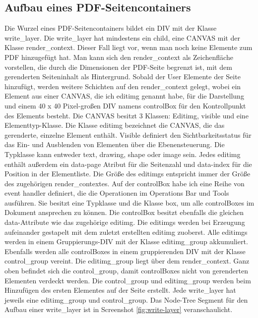 \subsection{Aufbau eines PDF-Seitencontainers}
Die Wurzel eines PDF-Seitencontainers bildet ein DIV mit der Klasse write\_layer. Die write\_layer hat mindestens ein child, eine CANVAS mit der Klasse render\_context. Dieser Fall liegt vor, wenn man noch keine Elemente zum PDF hinzugefügt hat. Man kann sich den render\_context als Zeichenfläche vorstellen, die durch die Dimensionen der PDF-Seite begrenzt ist, mit dem gerenderten Seiteninhalt als Hintergrund. Sobald der User Elemente der Seite hinzufügt, werden weitere Schichten auf den render\_context gelegt, wobei ein Element aus einer CANVAS, die ich editimg genannt habe, für die Darstellung und einem 40 x 40 Pixel-großen DIV namens controlBox für den Kontrollpunkt des Elements besteht. Die CANVAS besitzt 3 Klassen: Editimg, visible und eine Elementtyp-Klasse. Die Klasse editimg bezeichnet die CANVAS, die das gerenderte, einzelne Element enthält. Visible definiert den Sichtbarkeitsstatus für das Ein- und Ausblenden von Elementen über die Ebenensteuerung. Die Typklasse kann entweder text, drawing, shape oder image sein. Jedes editimg enthält außerdem ein data-page Atribut für die Seitenzahl und data-index für die Position in der Elementliste. Die Größe des editimgs entspricht immer der Größe des zugehörigen render\_contextes. Auf der controlBox habe ich eine Reihe von event handler definiert, die die Operationen im Operations Bar und Tools ausführen. Sie besitzt eine Typklasse und die Klasse box, um alle controlBoxes im Dokument ansprechen zu können. Die controlBox besitzt ebenfalls die gleichen data-Attribute wie das zugehörige editimg. Die editimgs werden bei Erzeugung aufeinander gestapelt mit dem zuletzt erstellten editimg zuoberst. Alle editimgs werden in einem Gruppierungs-DIV mit der Klasse editimg\_group akkumuliert. Ebenfalls werden alle controlBoxes in einem gruppierenden DIV mit der Klasse control\_group vereint. Die editimg\_group liegt über dem render\_context. Ganz oben befindet sich die control\_group, damit controlBoxes nicht von gerenderten Elementen verdeckt werden. Die control\_group und editimg\_group werden beim Hinzufügen des ersten Elementes auf der Seite erstellt. Jede write\_layer hat jeweils eine editimg\_group und control\_group. Das Node-Tree Segment für den Aufbau einer write\_layer ist in Screenshot \ref{fig:write-layer} veranschaulicht. 

